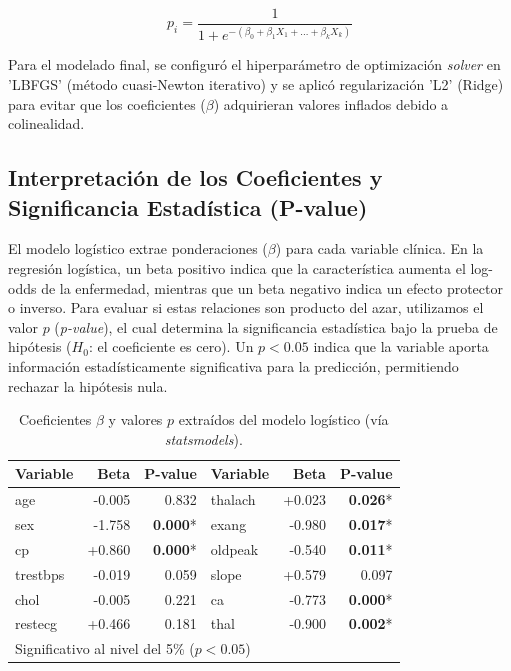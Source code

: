 \documentclass[twocolumn,10pt]{article}
\begin{document}
\begin{equation}
p_i = \frac{1}{1 + e^{-(\beta_0 + \beta_1 X_1 + \dots + \beta_k X_k)}}
\label{eq:logit}
\end{equation}

Para el modelado final, se configuró el hiperparámetro de optimización \textit{solver} en 'LBFGS' (método cuasi-Newton iterativo) y se aplicó regularización 'L2' (Ridge) para evitar que los coeficientes ($\beta$) adquirieran valores inflados debido a colinealidad.

\subsection{Interpretación de los Coeficientes y Significancia Estadística (P-value)}

El modelo logístico extrae ponderaciones ($\beta$) para cada variable clínica. En la regresión logística, un beta positivo indica que la característica aumenta el log-odds de la enfermedad, mientras que un beta negativo indica un efecto protector o inverso. Para evaluar si estas relaciones son producto del azar, utilizamos el valor $p$ (\textit{p-value}), el cual determina la significancia estadística bajo la prueba de hipótesis ($H_0$: el coeficiente es cero). Un $p < 0.05$ indica que la variable aporta información estadísticamente significativa para la predicción, permitiendo rechazar la hipótesis nula.

\begin{table}[H]
\centering
\small
\setlength{\tabcolsep}{4pt}
\begin{tabular}{lrr | lrr}
\hline
\textbf{Variable} & \textbf{Beta} & \textbf{P-value} & \textbf{Variable} & \textbf{Beta} & \textbf{P-value} \\
\hline
age     & -0.005 & 0.832 & thalach & +0.023 & \textbf{0.026}* \\
sex     & -1.758 & \textbf{0.000}* & exang   & -0.980 & \textbf{0.017}* \\
cp      & +0.860 & \textbf{0.000}* & oldpeak & -0.540 & \textbf{0.011}* \\
trestbps& -0.019 & 0.059 & slope   & +0.579 & 0.097 \\
chol    & -0.005 & 0.221 & ca      & -0.773 & \textbf{0.000}* \\
restecg & +0.466 & 0.181 & thal    & -0.900 & \textbf{0.002}* \\
\hline
\multicolumn{6}{l}{\footnotesize * Significativo al nivel del 5\% ($p < 0.05$)}
\end{tabular}
\caption{Coeficientes $\beta$ y valores $p$ extraídos del modelo logístico (vía \textit{statsmodels}).}
\label{tab:betas}
\end{table}
\end{document}

